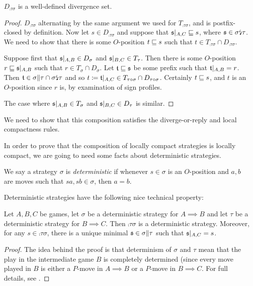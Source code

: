 \documentclass{article}
\newcommand{\dv}{{\text{\lightning}}}
\begin{document}
\begin{proposition}
  $D_{\comp\tau\sigma}$ is a well-defined divergence set.
  \begin{proof}
    $D_{\comp\tau\sigma}$ alternating by the same argument we used for $T_{\comp\tau\sigma}$, and is postfix-closed by definition.  Now let $s\in D_{\comp\tau\sigma}$ and suppose that $\mathfrak s\vert_{A,C}\sqsubseteq s$, where $\s\in \sigma\dv\tau$.  We need to show that there is some $O$-position $t\sqsubseteq s$ such that $t\in T_{\comp\tau\sigma}\cap D_{\comp\tau\sigma}$.  

    Suppose first that $\mathfrak s\vert_{A,B}\in D_\sigma$ and $\mathfrak s\vert_{B,C}\in T_\tau$.  Then there is some $O$-position $r\sqsubseteq \mathfrak s\vert_{A,B}$ such that $r\in T_\sigma\cap D_\sigma$.  Let $\mathfrak t\sqsubseteq\mathfrak s$ be some prefix such that $\mathfrak t\vert_{A,B}=r$.  Then $\t\in\sigma\|\tau\cap\sigma\dv\tau$ and so $t\coloneqq\mathfrak t\vert_{A,C}\in T_{\tau \circ \sigma}\cap D_{\tau \circ \sigma}$.  Certainly $t\sqsubseteq s$, and $t$ is an $O$-position since $r$ is, by examination of sign profiles.

    The case where $\mathfrak s\vert_{A,B}\in T_\sigma$ and $\mathfrak s\vert_{B,C}\in D_\tau$ is similar.
  \end{proof}
\end{proposition}

We need to show that this composition satisfies the diverge-or-reply and local compactness rules.  

In order to prove that the composition of locally compact strategies is locally compact, we are going to need some facts about deterministic strategies.

\begin{definition}
  We say a strategy $\sigma$ is \emph{deterministic} if whenever $s\in\sigma$ is an $O$-position and $a,b$ are moves such that $sa,sb\in\sigma$, then $a=b$.
\end{definition}

Deterministic strategies have the following nice technical property:

\begin{proposition}
  Let $A,B,C$ be games, let $\sigma$ be a deterministic strategy for $A\implies B$ and let $\tau$ be a deterministic strategy for $B\implies C$.  Then $\comp\tau\sigma$ is a deterministic strategy.  Moreover, for any $s\in\comp\tau\sigma$, there is a unique minimal $\mathfrak s\in\sigma\|\tau$ such that $\mathfrak s\vert_{A,C}=s$.
  \begin{proof}
    The idea behind the proof is that determinism of $\sigma$ and $\tau$ mean that the play in the intermediate game $B$ is completely determined (since every move played in $B$ is either a $P$-move in $A\implies B$ or a $P$-move in $B\implies C$.  For full details, see \cite{abramskyjagadeesangames}.
  \end{proof}
\end{proposition}
\end{document}
